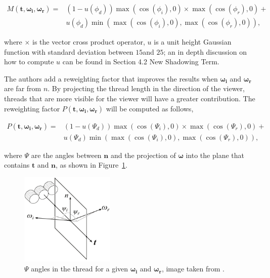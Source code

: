\documentclass[12pt]{article}
\newcommand{\omegai}{\boldsymbol{\omega_i}}
\newcommand{\omegar}{\boldsymbol{\omega_r}}
\newcommand{\tb}{\mathbf{t}}
\begin{document}
\begin{equation}
\begin{split}
M(\tb, \omegai, \omegar) =& (1 - u(\phi_d)) \max(\cos(\phi_i), 0) \times \max(\cos(\phi_r), 0) + \\
& u(\phi_d) \min( \max(\cos(\phi_i), 0), \max(\cos(\phi_r), 0) ),
\end{split}
\end{equation}

where $\times$ is the vector cross product operator, $u$ is a unit height Gaussian function with standard deviation between $15$\textdegree and $25$\textdegree; an in depth discussion on how to compute $u$ can be found in \citeauthor{Ashikmin2000} \cite{Ashikmin2000} Section 4.2 New Shadowing Term.

The authors add a reweighting factor that improves the results when $\omegai$ and $\omegar$ are far from $n$.
By projecting the thread length in the direction of the viewer, threads that are more visible for the viewer will have a greater contribution.
The reweighting factor $P(\tb, \omegai, \omegar)$ will be computed as follows,

\begin{equation}
\begin{split}
P(\tb, \omegai, \omegar) =& (1 - u(\Psi_d)) \max(\cos(\Psi_i), 0) \times \max(\cos(\Psi_r), 0) + \\
& u(\Psi_d) \min( \max(\cos(\Psi_i), 0), \max(\cos(\Psi_r), 0) ),
\end{split}
\end{equation}

where $\Psi$ are the angles between $\mathbf{n}$ and the projection of $\boldsymbol{\omega}$ into the plane that contains $\tb$ and $\mathbf{n}$, as shown in Figure~\ref{fig:psi_thread_angles}.

\begin{figure}[htbp!]
\centering
\includegraphics[width=0.4\textwidth]{images/psi_thread_angles}
	\caption{$\Psi$ angles in the thread for a given $\omegai$ and $\omegar$, image taken from \cite{Sadeghi2013}.}
	\label{fig:psi_thread_angles}
\end{figure}
\end{document}
